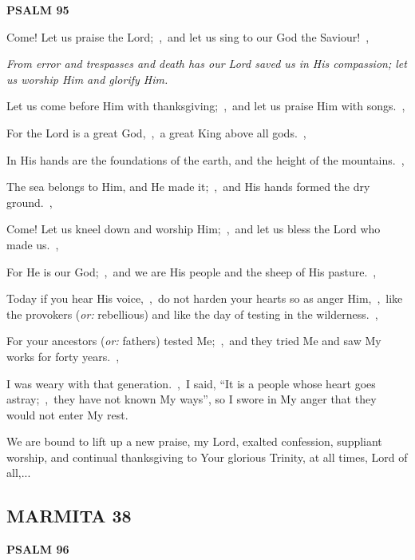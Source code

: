 \documentclass[12pt,twoside,a5paper]{article}
\newcommand{\marmita}[1]{\subsection*{MARMITA {#1}}}
\newcommand{\psalm}[1]{\textbf{PSALM {#1}}\nopagebreak}
\newcommand{\qanona}[1]{{\liturgicalhint{Qanona.} \emph{#1}}}
\newcommand{\slota}[1]{\liturgicalhint{Slota.} #1}
\newcommand{\translationoption}[1]{\emph{or:} #1}
\begin{document}
\psalm{95}

\begin{normalparskip}
  Come! Let us praise the Lord;~\sep\ and let us sing to our God the Saviour!~\sep

  \qanona{From error and trespasses and death has our Lord saved us in His compassion; let us worship Him and glorify Him.}

  Let us come before Him with thanksgiving;~\sep\ and let us praise Him with songs.~\sep

  For the Lord is a great God,~\sep\ a great King above all gods.~\sep

  In His hands are the foundations of the earth, and the height of the mountains.~\sep

  The sea belongs to Him, and He made it;~\sep\ and His hands formed the dry ground.~\sep

  Come! Let us kneel down and worship Him;~\sep\ and let us bless the Lord who made us.~\sep

  For He is our God;~\sep\ and we are His people and the sheep of His pasture.~\sep

  Today if you hear His voice,~\sep\ do not harden your hearts so as anger Him,~\sep\ like the provokers (\translationoption{rebellious}) and like the day of testing in the wilderness.~\sep

  For your ancestors (\translationoption{fathers}) tested Me;~\sep\ and they tried Me and saw My works for forty years.~\sep

  I was weary with that generation.~\sep\ I said, ``It is a people whose heart goes astray;~\sep\ they have not known My ways'', so I swore in My anger that they would not enter My rest.
\end{normalparskip}

\slota{We are bound to lift up a new praise, my Lord, exalted confession, suppliant worship, and continual thanksgiving to Your glorious Trinity, at all times, Lord of all,...}

\marmita{38}

\psalm{96}
\end{document}
